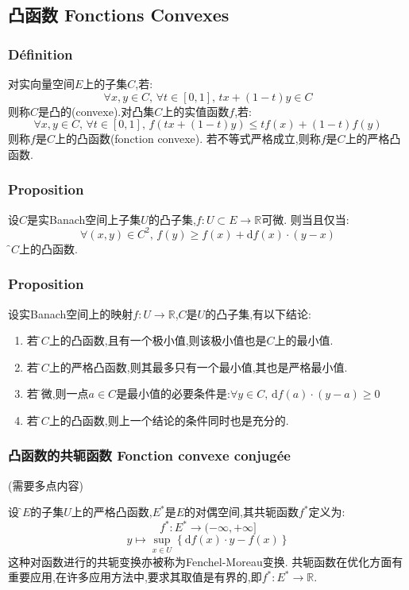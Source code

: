 \documentclass[12pt, a4paper, oneside]{ctexbook}
\newcommand{\di }{\text{d}}%
\newcommand{\R }{\mathbb{R}}%
\begin{document}
  \subsection{凸函数 Fonctions Convexes}
  \subsubsection{Définition}
  对实向量空间$E$上的子集$C$,若:
  $$
  \forall x,y\in C,\,\forall t\in[0,1],\,tx+(1-t)y\in C
  $$
  则称$C$是凸的(convexe).对凸集$C$上的实值函数$f$,若:
  $$
  \forall x,y\in C,\,\forall t\in[0,1],\,f(tx+(1-t)y)\leq tf(x)+(1-t)f(y)
  $$
  则称$f$是$C$上的凸函数(fonction convexe).
  若不等式严格成立,则称$f$是$C$上的严格凸函数.
  \subsubsection{Proposition}
  设$C$是实Banach空间上子集$U$的凸子集,$f:U\subset E\rightarrow \R$可微.
  则当且仅当:
  $$
    \forall(x,y)\in C^2,\,f(y)\geq f(x)+\di f(x)\cdot (y-x)
  $$
  \f 是$C$上的凸函数.
  \subsubsection{Proposition}
  设实Banach空间上的映射$f:U\rightarrow \R$,$C$是$U$的凸子集,有以下结论:
  \begin{enumerate}
    \item 若\f 是$C$上的凸函数,且有一个极小值,则该极小值也是$C$上的最小值.
    \item 若\f 是$C$上的严格凸函数,则其最多只有一个最小值,其也是严格最小值.
    \item 若\f 可微,则一点$a\in C$是最小值的必要条件是:$\forall y\in C,\,\di f(a)\cdot(y-a)\geq 0$
    \item 若\f 是$C$上的凸函数,则上一个结论的条件同时也是充分的.
  \end{enumerate}

  \subsubsection{凸函数的共轭函数 Fonction convexe conjugée}
  (需要多点内容)


  设\f 是$E$的子集$U$上的严格凸函数,$E^*$是$E$的对偶空间,其共轭函数$f^*$定义为:
  $$
      f^*:E^*\rightarrow (-\infty,+\infty]
  $$
  $$
      y\mapsto \sup_{x\in U}\left\{\di f(x)\cdot y-f(x)\right\}
  $$
  这种对函数进行的共轭变换亦被称为Fenchel-Moreau变换.
  共轭函数在优化方面有重要应用,在许多应用方法中,要求其取值是有界的,即$f^*:E^*\rightarrow \R$.
\end{document}
